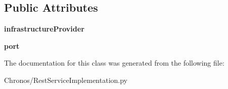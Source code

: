 \subsection*{Public Attributes}
\begin{DoxyCompactItemize}
\item 
{\bfseries infrastructure\+Provider}\hypertarget{classChronos_1_1RestServiceImplementation_1_1ChronosGatewayRestService_aa9f8684981444fc2282bf8c1bdd39b14}{}\label{classChronos_1_1RestServiceImplementation_1_1ChronosGatewayRestService_aa9f8684981444fc2282bf8c1bdd39b14}

\item 
{\bfseries port}\hypertarget{classChronos_1_1RestServiceImplementation_1_1ChronosGatewayRestService_a6b390197c253c3c2ef94c55701ddbd12}{}\label{classChronos_1_1RestServiceImplementation_1_1ChronosGatewayRestService_a6b390197c253c3c2ef94c55701ddbd12}

\end{DoxyCompactItemize}


The documentation for this class was generated from the following file\+:\begin{DoxyCompactItemize}
\item 
Chronos/Rest\+Service\+Implementation.\+py\end{DoxyCompactItemize}
